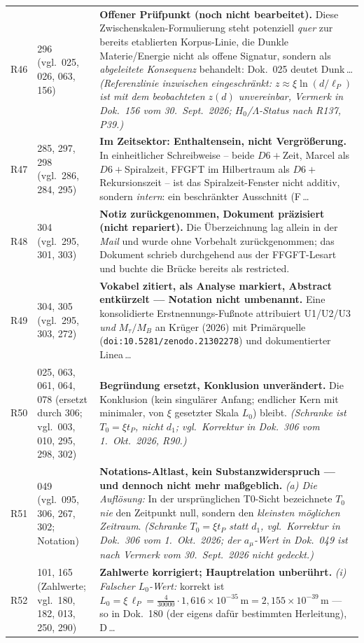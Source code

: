 \begin{longtable}{@{}p{0.9cm}p{3.1cm}p{10.2cm}@{}}
R46 & 296 (vgl.\ 025, 026, 063, 156) & \textbf{Offener Prüfpunkt (noch nicht bearbeitet).} Diese Zwischenskalen-Formulierung steht potenziell \emph{quer} zur bereits etablierten Korpus-Linie, die Dunkle Materie/Energie nicht als offene Signatur, sondern als \emph{abgeleitete Konsequenz} behandelt: Dok.~025 deutet Dunk\,\ldots{} \emph{(Referenzlinie inzwischen eingeschränkt: $z\approx\xi\ln(d/\ell_P)$ ist mit dem beobachteten $z(d)$ unvereinbar, Vermerk in Dok.~156 vom 30.~Sept.~2026; $H_0$/$\Lambda$-Status nach R137, P39.)} \\
R47 & 285, 297, 298 (vgl.\ 286, 284, 295) & \textbf{Im Zeitsektor: Enthaltensein, nicht Vergrößerung.} In einheitlicher Schreibweise -- beide $D6+$Zeit, Marcel als $D6+$Spiralzeit, FFGFT im Hilbertraum als $D6+$Rekursionszeit -- ist das Spiralzeit-Fenster nicht additiv, sondern \emph{intern}: ein beschränkter Ausschnitt (F\,\ldots \\
R48 & 304 (vgl.\ 295, 301, 303) & \textbf{Notiz zurückgenommen, Dokument präzisiert (nicht repariert).} Die Überzeichnung lag allein in der \emph{Mail} und wurde ohne Vorbehalt zurückgenommen; das Dokument schrieb durchgehend aus der FFGFT-Lesart und buchte die Brücke bereits als restricted. \\
R49 & 304, 305 (vgl.\ 295, 303, 272) & \textbf{Vokabel zitiert, als Analyse markiert, Abstract entkürzelt --- Notation nicht umbenannt.} Eine konsolidierte Erstnennungs-Fußnote attribuiert U1/U2/U3 \emph{und} $M_\tau/M_B$ an Krüger (2026) mit Primärquelle (\texttt{doi:10.5281/zenodo.21302278}) und dokumentierter Linea\,\ldots \\
R50 & 025, 063, 061, 064, 078 (ersetzt durch 306; vgl.\ 003, 010, 295, 298, 302) & \textbf{Begründung ersetzt, Konklusion unverändert.} Die Konklusion (kein singulärer Anfang; endlicher Kern mit minimaler, von $\xi$ gesetzter Skala $L_0$) bleibt. \emph{(Schranke ist $T_0=\xi t_P$, nicht $d_1$; vgl.\ Korrektur in Dok.~306 vom 1.~Okt.~2026, R90.)} \\
R51 & 049 (vgl.\ 095, 306, 267, 302; Notation) & \textbf{Notations-Altlast, kein Substanzwiderspruch --- und dennoch nicht mehr maßgeblich.} \emph{(a) Die Auflösung:} In der ursprünglichen T0-Sicht bezeichnete $T_0$ \emph{nie} den Zeitpunkt null, sondern den \emph{kleinsten möglichen Zeitraum}. \emph{(Schranke $T_0=\xi t_P$ statt $d_1$, vgl.\ Korrektur in Dok.~306 vom 1.~Okt.~2026; der $a_\mu$-Wert in Dok.~049 ist nach Vermerk vom 30.~Sept.~2026 nicht gedeckt.)} \\
R52 & 101, 165 (Zahlwerte; vgl.\ 180, 182, 013, 250, 290) & \textbf{Zahlwerte korrigiert; Hauptrelation unberührt.} \emph{(i) Falscher $L_0$-Wert:} korrekt ist $L_0 = \xi\,\ell_P = \tfrac{4}{30000}\cdot 1{,}616\times10^{-35}\,\text{m} = \boxed{2{,}155\times10^{-39}\,\text{m}}$ --- so in Dok.~180 (der eigens dafür bestimmten Herleitung), D\,\ldots \\

\end{longtable}
